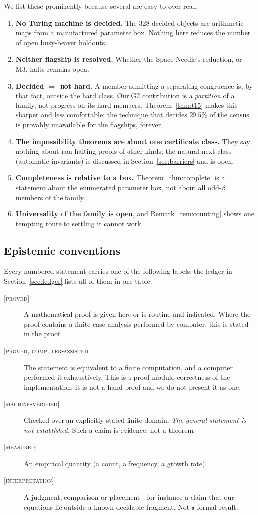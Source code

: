\documentclass[11pt]{article}
\theoremstyle{definition}
\theoremstyle{remark}
\newcommand{\Proved}{\textsc{[proved]}}
\newcommand{\CAP}{\textsc{[proved, computer-assisted]}}
\newcommand{\MV}{\textsc{[machine-verified]}}
\newcommand{\Meas}{\textsc{[measured]}}
\newcommand{\Interp}{\textsc{[interpretation]}}
\begin{document}
We list these prominently because several are easy to over-read.

\begin{enumerate}
\item \textbf{No Turing machine is decided.}  The $328$ decided objects are
  arithmetic maps from a manufactured parameter box.  Nothing here reduces
  the number of open busy-beaver holdouts.
\item \textbf{Neither flagship is resolved.}  Whether the Space Needle's
  reduction, or M3, halts remains open.
\item \textbf{Decided $\Rightarrow$ not hard.}  A member admitting a
  separating congruence is, by that fact, outside the hard class.  Our G2
  contribution is a \emph{partition} of a family, not progress on its hard
  members.  Theorem~\ref{thm:t15} makes this sharper and less comfortable: the
  technique that decides $29.5\%$ of the census is provably unavailable for
  the flagships, forever.
\item \textbf{The impossibility theorems are about one certificate class.}
  They say nothing about non-halting proofs of other kinds; the natural next
  class (automatic invariants) is discussed in Section~\ref{sec:barriers} and
  is open.
\item \textbf{Completeness is relative to a box.}  Theorem~\ref{thm:complete}
  is a statement about the enumerated parameter box, not about all
  odd-$\beta$ members of the family.
\item \textbf{Universality of the family is open}, and
  Remark~\ref{rem:counting} shows one tempting route to settling it cannot
  work.
\end{enumerate}

\subsection{Epistemic conventions}
\label{sec:conventions}

Every numbered statement carries one of the following labels; the ledger in
Section~\ref{sec:ledger} lists all of them in one table.

\begin{description}
\item[\Proved] A mathematical proof is given here or is routine and
  indicated.  Where the proof contains a finite case analysis performed by
  computer, this is stated in the proof.
\item[\CAP] The statement is equivalent to a finite computation, and a
  computer performed it exhaustively.  This is a proof modulo correctness of
  the implementation; it is not a hand proof and we do not present it as one.
\item[\MV] Checked over an explicitly stated finite domain.  \emph{The general
  statement is not established.}  Such a claim is evidence, not a theorem.
\item[\Meas] An empirical quantity (a count, a frequency, a growth rate).
\item[\Interp] A judgment, comparison or placement---for instance a claim that
  our equations lie outside a known decidable fragment.  Not a formal result.
\end{description}
\end{document}
